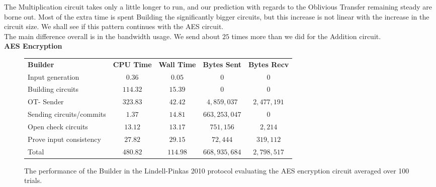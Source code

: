 \documentclass[ %
                    author={Nicholas Tutte},
                supervisor={Prof. Nigel Smart},
                    degree={MEng},
                     title={Secure Two Party Computation},
                  subtitle={A practical comparison of recent protocols},
                      type={Research - GG1K},
                      year={2015} ]{dissertation}
\begin{document}
				The Multiplication circuit takes only a little longer to run, and our prediction with regards to the Oblivious Transfer remaining steady are borne out. Most of the extra time is spent Building the significantly bigger circuits, but this increase is not linear with the increase in the circuit size. We shall see if this pattern continues with the AES circuit.\\

				The main difference overall is in the bandwidth usage. We send about $25$ times more than we did for the Addition circuit.\\

				\pagebreak
				\FloatBarrier
				\noindent \textbf{AES Encryption}
				\begin{figure}[!ht]
					\begin{tabular}{| p{4.3cm} | c c c c |}
						\hline
						\textbf{Builder} & \textbf{CPU Time} & \textbf{Wall Time} & \textbf{Bytes Sent} & \textbf{Bytes Recv} \\
						\thickhline
						Input generation & $0.36$ & $0.05$ & $0$ & $0$ \\
						\hline
						Building circuits & $114.32$ & $15.39$ & $0$ & $0$ \\
						\hline
						OT- Sender & $323.83$ & $42.42$ & $4,859,037$ & $2,477,191$ \\
						\hline
						Sending circuits/commits & $1.37$ & $14.81$ & $663,253,047$ & $0$ \\
						\hline
						Open check circuits & $13.12$ & $13.17$ & $751,156$ & $2,214$ \\
						\hline
						Prove input consistency & $27.82$ & $29.15$ & $72,444$ & $319,112$ \\
						\thickhline
						Total & $480.82$ & $114.98$ & $668,935,684$ & $2,798,517$ \\
						\hline
					\end{tabular}
					\caption{The performance of the Builder in the Lindell-Pinkas 2010 protocol evaluating the AES encryption circuit averaged over 100 trials. \label{table:LP_2010_AES_Builder}}
				\end{figure}
\end{document}
